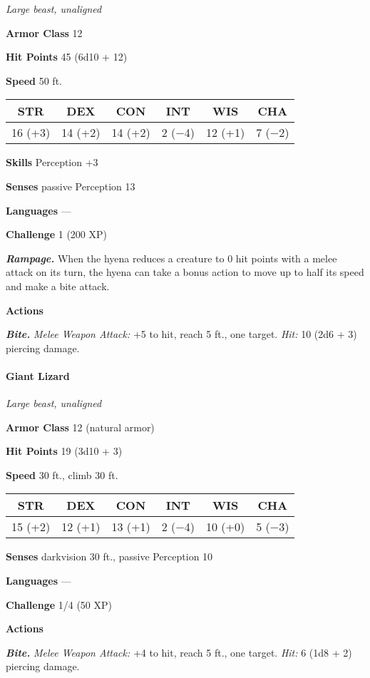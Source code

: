 \documentclass[
]{article}
\begin{document}
\emph{Large beast, unaligned}

\textbf{Armor Class} 12

\textbf{Hit Points} 45 (6d10 + 12)

\textbf{Speed} 50 ft.

\begin{longtable}[]{@{}cccccc@{}}
\toprule
STR & DEX & CON & INT & WIS & CHA\tabularnewline
\midrule
\endhead
16 (+3) & 14 (+2) & 14 (+2) & 2 (−4) & 12 (+1) & 7 (−2)\tabularnewline
\bottomrule
\end{longtable}

\textbf{Skills} Perception +3

\textbf{Senses} passive Perception 13

\textbf{Languages} ---

\textbf{Challenge} 1 (200 XP)

\emph{\textbf{Rampage.}} When the hyena reduces a creature to 0 hit
points with a melee attack on its turn, the hyena can take a bonus
action to move up to half its speed and make a bite attack.

\textbf{Actions}

\emph{\textbf{Bite.}} \emph{Melee Weapon Attack:} +5 to hit, reach 5
ft., one target. \emph{Hit:} 10 (2d6 + 3) piercing damage.

\hypertarget{giant-lizard}{%
\paragraph{Giant Lizard}\label{giant-lizard}}

\emph{Large beast, unaligned}

\textbf{Armor Class} 12 (natural armor)

\textbf{Hit Points} 19 (3d10 + 3)

\textbf{Speed} 30 ft., climb 30 ft.

\begin{longtable}[]{@{}cccccc@{}}
\toprule
STR & DEX & CON & INT & WIS & CHA\tabularnewline
\midrule
\endhead
15 (+2) & 12 (+1) & 13 (+1) & 2 (−4) & 10 (+0) & 5 (−3)\tabularnewline
\bottomrule
\end{longtable}

\textbf{Senses} darkvision 30 ft., passive Perception 10

\textbf{Languages} ---

\textbf{Challenge} 1/4 (50 XP)

\textbf{Actions}

\emph{\textbf{Bite.}} \emph{Melee Weapon Attack:} +4 to hit, reach 5
ft., one target. \emph{Hit:} 6 (1d8 + 2) piercing damage.
\end{document}
